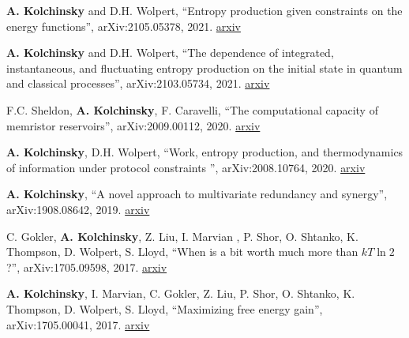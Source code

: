 
\textbf{A. Kolchinsky} and D.H. Wolpert, ``Entropy production given constraints on the energy functions'', arXiv:2105.05378, 2021. \href{http://arxiv.org/abs/2105.05378}{arxiv}


\textbf{A. Kolchinsky} and D.H. Wolpert, ``The dependence of integrated, instantaneous, and fluctuating entropy production on the initial state in quantum and classical processes'', arXiv:2103.05734, 2021. \href{http://arxiv.org/abs/2103.05734}{arxiv}


F.C. Sheldon, \textbf{A. Kolchinsky}, F. Caravelli, ``The computational capacity of memristor reservoirs'', arXiv:2009.00112, 2020. \href{http://arxiv.org/abs/2009.00112}{arxiv}


\textbf{A. Kolchinsky}, D.H. Wolpert, ``Work, entropy production, and thermodynamics of information under protocol constraints
'', arXiv:2008.10764, 2020. \href{http://arxiv.org/abs/2008.10764}{arxiv}


\textbf{A. Kolchinsky}, ``A novel approach to multivariate redundancy and synergy'', arXiv:1908.08642, 2019. \href{https://arxiv.org/abs/1908.08642}{arxiv}

C. Gokler, \textbf{A. Kolchinsky}, Z. Liu, I. Marvian , P. Shor, O. Shtanko, K. Thompson, D. Wolpert, S. Lloyd, ``When is a bit worth much more than $kT \ln 2$?'', arXiv:1705.09598, 2017. \href{https://arxiv.org/abs/1705.09598}{arxiv}

\textbf{A. Kolchinsky}, I. Marvian, C. Gokler, Z. Liu, P. Shor, O. Shtanko, K. Thompson, D. Wolpert, S. Lloyd, ``Maximizing free energy gain'', arXiv:1705.00041, 2017. \href{https://arxiv.org/abs/1705.00041}{arxiv}

